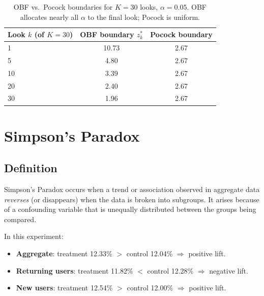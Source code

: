\begin{table}[h]
  \centering
  \small
  \begin{tabular}{lcc}
    \toprule
    Look $k$ (of $K=30$) & OBF boundary $z_k^*$ & Pocock boundary \\
    \midrule
    1  & 10.73 & 2.67 \\
    5  & 4.80  & 2.67 \\
    10 & 3.39  & 2.67 \\
    20 & 2.40  & 2.67 \\
    30 & 1.96  & 2.67 \\
    \bottomrule
  \end{tabular}
  \caption{OBF vs.\ Pocock boundaries for $K=30$ looks, $\alpha=0.05$.
    OBF allocates nearly all $\alpha$ to the final look; Pocock is uniform.}
  \label{tab:obf-pocock}
\end{table}

\section{Simpson's Paradox}
\label{sec:abtest-simpsons}


\subsection{Definition}

Simpson's Paradox occurs when a trend or association observed in aggregate data
\emph{reverses} (or disappears) when the data is broken into subgroups. It
arises because of a confounding variable that is unequally distributed between
the groups being compared.

In this experiment:
\begin{itemize}
  \item \textbf{Aggregate}: treatment 12.33\% $>$ control 12.04\%
    $\Rightarrow$ positive lift.
  \item \textbf{Returning users}: treatment 11.82\% $<$ control 12.28\%
    $\Rightarrow$ negative lift.
  \item \textbf{New users}: treatment 12.54\% $>$ control 12.00\%
    $\Rightarrow$ positive lift.
\end{itemize}

